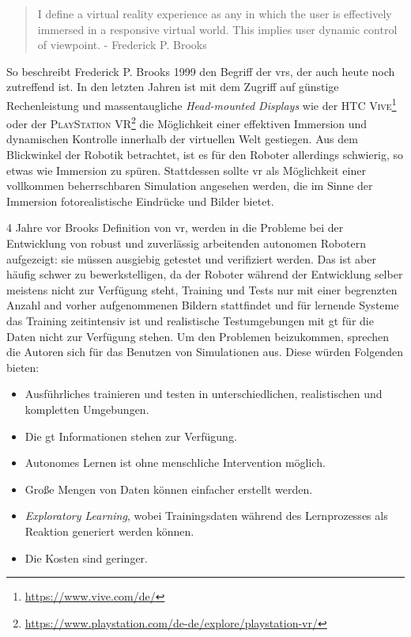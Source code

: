 \begin{quote}
\glqq I define a virtual reality experience as any in which the user is effectively immersed in a responsive virtual world. This implies user dynamic control of viewpoint.\grqq \newline
 \hfill - Frederick P. Brooks
\end{quote}
So beschreibt Frederick P. Brooks 1999 \cite{brooks} den Begriff der \glspl{vr}, der auch heute noch zutreffend ist. In den letzten Jahren ist mit dem Zugriff auf günstige Rechenleistung und massentaugliche \textit{Head-mounted Displays} wie der \textsc{HTC Vive}\footnote{\url{https://www.vive.com/de/}} oder der \textsc{PlayStation VR}\footnote{\url{https://www.playstation.com/de-de/explore/playstation-vr/}} die Möglichkeit einer effektiven Immersion und dynamischen Kontrolle innerhalb der virtuellen Welt gestiegen. Aus dem Blickwinkel der Robotik betrachtet, ist es für den Roboter allerdings schwierig, so etwas wie Immersion zu spüren. Stattdessen sollte \gls{vr} als Möglichkeit einer vollkommen beherrschbaren Simulation angesehen werden, die im Sinne der Immersion fotorealistische Eindrücke und Bilder bietet.   \par

4 Jahre vor Brooks Definition von \gls{vr}, werden in \cite{burger1995} die Probleme bei der Entwicklung von robust und zuverlässig arbeitenden autonomen Robotern aufgezeigt: sie müssen ausgiebig getestet und verifiziert werden. Das ist aber häufig schwer zu bewerkstelligen, da der Roboter während der Entwicklung selber meistens nicht zur Verfügung steht, Training und Tests nur mit einer begrenzten Anzahl and vorher aufgenommenen Bildern stattfindet und für lernende Systeme das Training zeitintensiv ist und realistische Testumgebungen mit \gls{gt} für die Daten nicht zur Verfügung stehen. Um den Problemen beizukommen, sprechen die Autoren sich für das Benutzen von Simulationen aus. Diese würden Folgenden bieten: 
\begin{itemize}
	\item Ausführliches trainieren und testen in unterschiedlichen, realistischen und kompletten Umgebungen.
	\item Die \gls{gt} Informationen stehen zur Verfügung.
	\item Autonomes Lernen ist ohne menschliche Intervention möglich.
	\item Große Mengen von Daten können einfacher erstellt werden.
	\item \textit{Exploratory Learning}, wobei Trainingsdaten während des Lernprozesses als Reaktion generiert werden können. 
	\item Die Kosten sind geringer.
\end{itemize}
\par

